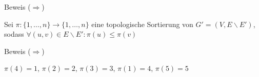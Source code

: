 \documentclass{beamer}
\begin{document}
\begin{frame}{Beweis (\glqq $\Rightarrow$\grqq)}
\begin{pointlist}
\item Sei $\pi:\{1,\dots,n\}\rightarrow \{1,\dots,n\}$ eine topologische Sortierung von $G'=(V, E\backslash E')$, sodass $\forall (u,v)\in E\backslash E': \pi(u)\leq \pi(v)$ 
\end{pointlist}
\begin{figure}
    \centering
\end{figure}
\end{frame}

\begin{frame}{Beweis (\glqq $\Rightarrow$\grqq)}
\begin{pointlist}
\item $\pi(4)=1$, $\pi(2)=2$, $\pi(3)=3$, $\pi(1)=4$, $\pi(5)=5$
\end{pointlist}
\begin{figure}
    \centering
\end{figure}
\end{frame}
\end{document}
